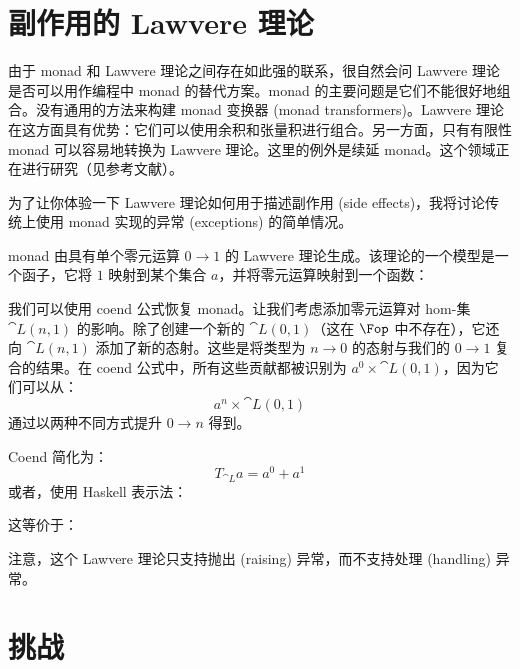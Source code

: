 \section{副作用的 Lawvere 理论}

由于 monad 和 Lawvere 理论之间存在如此强的联系，很自然会问 Lawvere 理论是否可以用作编程中 monad 的替代方案。monad 的主要问题是它们不能很好地组合。没有通用的方法来构建 monad 变换器 (monad transformers)。Lawvere 理论在这方面具有优势：它们可以使用余积和张量积进行组合。另一方面，只有有限性 monad 可以容易地转换为 Lawvere 理论。这里的例外是续延 monad。这个领域正在进行研究（见参考文献）。

为了让你体验一下 Lawvere 理论如何用于描述副作用 (side effects)，我将讨论传统上使用  monad 实现的异常 (exceptions) 的简单情况。

 monad 由具有单个零元运算 $0 \to 1$ 的 Lawvere 理论生成。该理论的一个模型是一个函子，它将 $1$ 映射到某个集合 $a$，并将零元运算映射到一个函数：

我们可以使用 coend 公式恢复  monad。让我们考虑添加零元运算对 hom-集 $\cat{L}(n, 1)$ 的影响。除了创建一个新的 $\cat{L}(0, 1)$（这在 $\Fop$ 中不存在），它还向 $\cat{L}(n, 1)$ 添加了新的态射。这些是将类型为 $n \to 0$ 的态射与我们的 $0 \to 1$ 复合的结果。在 coend 公式中，所有这些贡献都被识别为 $a^0 \times \cat{L}(0, 1)$，因为它们可以从：
\[a^n \times \cat{L}(0, 1)\]
通过以两种不同方式提升 $0 \to n$ 得到。

\begin{figure}[H]
  \centering
\end{figure}

\noindent
Coend 简化为：
\[T_{\cat{L}} a = a^0 + a^1\]
或者，使用 Haskell 表示法：

这等价于：

注意，这个 Lawvere 理论只支持抛出 (raising) 异常，而不支持处理 (handling) 异常。

\section{挑战}

